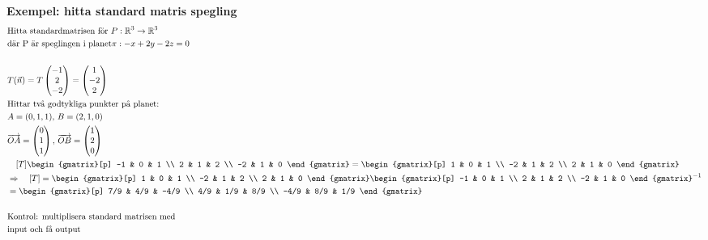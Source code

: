 \begin{multicols}{2}
\textbf{Exempel: hitta standard matris spegling}
\begin{align*}
  &\text{Hitta standardmatrisen för } P:\mathbb{R}^3 \to \mathbb{R}^3 \\
  &\text{där P är speglingen i planet} \pi: -x + 2y - 2z = 0 \\
  &\\
  &T(\vec{n})=T\begin{pmatrix} -1 \\ 2 \\ -2 \end{pmatrix} = \begin{pmatrix} 1 \\ -2 \\ 2 \end{pmatrix} \\
  &\text{Hittar två godtykliga punkter på planet: }   \\
  &A=(0,1,1), \, B=(2,1,0) \\
  &\overrightarrow{OA} = \begin{pmatrix} 0 \\ 1 \\ 1 \end{pmatrix}, \,
  \overrightarrow{OB} = \begin{pmatrix} 1 \\ 2 \\ 0 \end{pmatrix} \\
  &\quad [T]
  \begin{gmatrix}[p]
   -1 &  0 &  1  \\
    2 &  1 &  2  \\
   -2 &  1 &  0
  \end{gmatrix} =
  \begin{gmatrix}[p]
    1 &  0 &  1  \\
   -2 &  1 &  2  \\
    2 &  1 &  0
  \end{gmatrix}   \\
  &\Rightarrow\quad [T] =
  \begin{gmatrix}[p]
    1 &  0 &  1  \\
   -2 &  1 &  2  \\
    2 &  1 &  0
  \end{gmatrix}
 {\begin{gmatrix}[p]
   -1 &  0 &  1  \\
    2 &  1 &  2  \\
   -2 &  1 &  0
  \end{gmatrix}}^{-1} \\
  &=\begin{gmatrix}[p]
    7/9 &  4/9  & -4/9 \\
    4/9 &  1/9 &   8/9 \\
   -4/9 &  8/9 &   1/9
  \end{gmatrix} \\
  &\\
  &\text{Kontrol: multiplisera standard matrisen med} \\
  &\text{input och få output} \\
\end{align*}
\end{multicols}
\raggedcolumns

